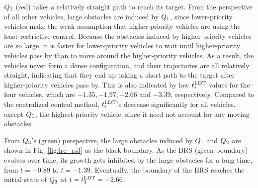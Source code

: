 $Q_1$ (red) takes a relatively straight path to reach its target. From the perspective of all other vehicles, large obstacles are induced by $Q_1$, since lower-priority vehicles make the weak assumption that higher-priority vehicles are using the least restrictive control. Because the obstacles induced by higher-priority vehicles are so large, it is faster for lower-priority vehicles to wait until higher-priority vehicles pass by than to move around the higher-priority vehicles. As a result, the vehicles never form a dense configuration, and their trajectories are all relatively straight, indicating that they end up taking a short path to the target after higher-priority vehicles pass by. This is also indicated by low $t^\text{LDT}_i$ values for the four vehicles, which are $-1.35, -1.97, -2.66$ and $-3.39$, respectively. Compared to the centralized control method, $t^\text{LDT}_i$'s decrease significantly for all vehicles, except $Q_1$, the highest-priority vehicle, since it need not account for any moving obstacles. 

From $Q_3$'s (green) perspective, the large obstacles induced by $Q_1$ and $Q_2$ are shown in Fig. \ref{fig:lrc_rs3} as the black boundary. As the BRS (green boundary) evolves over time, its growth gets inhibited by the large obstacles for a long time, from $t=-0.89$ to $t=-1.39$. Eventually, the boundary of the BRS reaches the initial state of $Q_3$ at $t = t^\text{LDT}_3 = -2.66$.

